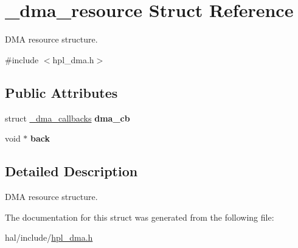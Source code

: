 \hypertarget{struct__dma__resource}{}\section{\+\_\+dma\+\_\+resource Struct Reference}
\label{struct__dma__resource}


D\+MA resource structure.  




{\ttfamily \#include $<$hpl\+\_\+dma.\+h$>$}

\subsection*{Public Attributes}
\begin{DoxyCompactItemize}
\item 
struct \hyperlink{struct__dma__callbacks}{\+\_\+dma\+\_\+callbacks} {\bfseries dma\+\_\+cb}
\item 
void $\ast$ {\bfseries back}
\end{DoxyCompactItemize}


\subsection{Detailed Description}
D\+MA resource structure. 

The documentation for this struct was generated from the following file\+:\begin{DoxyCompactItemize}
\item 
hal/include/\hyperlink{hpl__dma_8h}{hpl\+\_\+dma.\+h}\end{DoxyCompactItemize}
